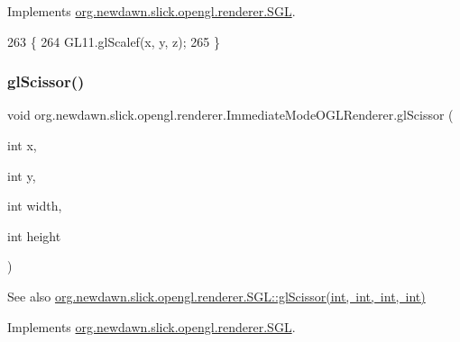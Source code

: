 Implements \mbox{\hyperlink{interfaceorg_1_1newdawn_1_1slick_1_1opengl_1_1renderer_1_1_s_g_l_a3af948fb9b1074143a0ce384a2035d02}{org.\+newdawn.\+slick.\+opengl.\+renderer.\+S\+GL}}.


\begin{DoxyCode}
263                                                     \{
264         GL11.glScalef(x, y, z);
265     \}
\end{DoxyCode}
\mbox{\label{classorg_1_1newdawn_1_1slick_1_1opengl_1_1renderer_1_1_immediate_mode_o_g_l_renderer_ad15ad5c6d86bfdabcb2b973506dd0cb3}} 
\subsubsection{\texorpdfstring{gl\+Scissor()}{glScissor()}}
{\footnotesize\ttfamily void org.\+newdawn.\+slick.\+opengl.\+renderer.\+Immediate\+Mode\+O\+G\+L\+Renderer.\+gl\+Scissor (\begin{DoxyParamCaption}\item[{int}]{x,  }\item[{int}]{y,  }\item[{int}]{width,  }\item[{int}]{height }\end{DoxyParamCaption})\hspace{0.3cm}{\ttfamily [inline]}}

\begin{DoxySeeAlso}{See also}
\mbox{\hyperlink{interfaceorg_1_1newdawn_1_1slick_1_1opengl_1_1renderer_1_1_s_g_l_a59255fbfa67e6f0cd325f2bbe418d358}{org.\+newdawn.\+slick.\+opengl.\+renderer.\+S\+G\+L\+::gl\+Scissor(int, int, int, int)}} 
\end{DoxySeeAlso}


Implements \mbox{\hyperlink{interfaceorg_1_1newdawn_1_1slick_1_1opengl_1_1renderer_1_1_s_g_l_a59255fbfa67e6f0cd325f2bbe418d358}{org.\+newdawn.\+slick.\+opengl.\+renderer.\+S\+GL}}.


